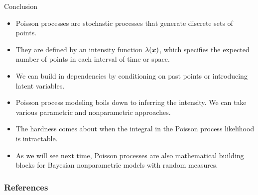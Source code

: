 \documentclass[aspectratio=169]{beamer}
\begin{document}
\begin{frame}{Conclusion}
    \begin{itemize}
        \itemsep1em
        
        \item Poisson processes are stochastic processes that generate discrete sets of points.
        
        \item They are defined by an intensity function $\lambda(\boldsymbol{x})$, which specifies the expected number of points in each interval of time or space.
        
        \item We can build in dependencies by conditioning on past points or introducing latent variables.
        
        \item Poisson process modeling boils down to inferring the intensity. We can take various parametric and nonparametric approaches.
        
        \item The hardness comes about when the integral in the Poisson process likelihood is intractable.
        
        \item As we will see next time, Poisson processes are also mathematical building blocks for Bayesian nonparametric models with random measures.
    \end{itemize}
\end{frame}

\begin{frame}[t,allowframebreaks]
        \frametitle{References}
        
        
\end{frame}
\end{document}
